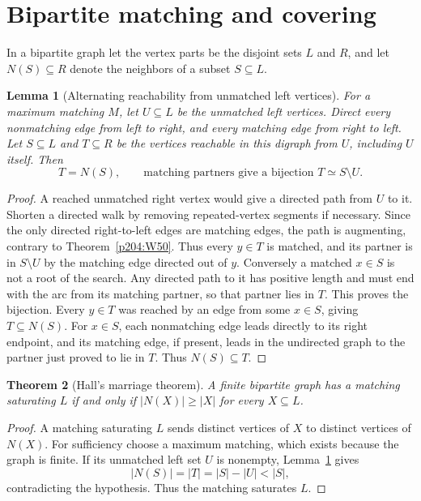 \documentclass[11pt,oneside,openany]{book}
\theoremstyle{plain}
\newtheorem{theorem}{Theorem}[chapter]
\newtheorem{lemma}[theorem]{Lemma}
\theoremstyle{definition}
\theoremstyle{remark}
\begin{document}
\section{Bipartite matching and covering}

In a bipartite graph let the vertex parts be the disjoint sets
\(L\) and \(R\), and let \(N(S)\subseteq R\) denote the neighbors
of a subset \(S\subseteq L\).

\begin{lemma}[Alternating reachability from unmatched left vertices]
\label{p204:alternating-reach}
For a maximum matching \(M\), let \(U\subseteq L\) be the unmatched
left vertices. Direct every nonmatching edge from left to right,
and every matching edge from right to left. Let \(S\subseteq L\)
and \(T\subseteq R\) be the vertices reachable in this digraph
from \(U\), including \(U\) itself. Then
\[
 T=N(S),\qquad \text{matching partners give a bijection }T\simeq S\setminus U .
\]
\end{lemma}

\begin{proof}
A reached unmatched right vertex would give a directed path from
\(U\) to it. Shorten a directed walk by removing repeated-vertex
segments if necessary. Since the only directed right-to-left edges
are matching edges, the path is augmenting, contrary to
Theorem~\ref{p204:W50}. Thus every \(y\in T\) is matched, and its
partner is in \(S\setminus U\) by the matching edge directed out
of \(y\). Conversely a matched \(x\in S\) is not a root of the
search. Any directed path to it has positive length and must end
with the arc from its matching partner, so that partner lies in
\(T\). This proves the bijection. Every \(y\in T\) was reached by
an edge from some \(x\in S\), giving \(T\subseteq N(S)\).
For \(x\in S\), each nonmatching edge leads directly to its right
endpoint, and its matching edge, if present, leads in the undirected
graph to the partner just proved to lie in \(T\). Thus \(N(S)\subseteq T\).
\end{proof}

\begin{theorem}[Hall's marriage theorem]\label{p204:W51}
A finite bipartite graph has a matching saturating \(L\) if and only
if \(|N(X)|\geq |X|\) for every \(X\subseteq L\).
\end{theorem}

\begin{proof}
A matching saturating \(L\) sends distinct vertices of \(X\) to
distinct vertices of \(N(X)\). For sufficiency choose a maximum
matching, which exists because the graph is finite. If its unmatched
left set \(U\) is nonempty, Lemma~\ref{p204:alternating-reach} gives
\[
 |N(S)|=|T|=|S|-|U|<|S|,
\]
contradicting the hypothesis. Thus the matching saturates \(L\).
\end{proof}
\end{document}
